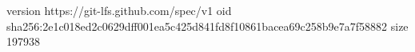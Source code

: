 version https://git-lfs.github.com/spec/v1
oid sha256:2e1c018ed2c0629dff001ea5c425d841fd8f10861bacea69c258b9e7a7f58882
size 197938
